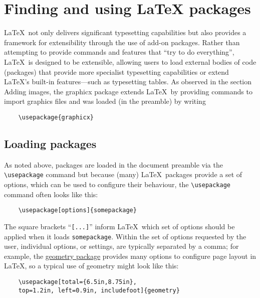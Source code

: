 \section{Finding and using LaTeX packages}
\label{sec:16}

\LaTeX\ not only delivers significant typesetting capabilities but also provides a framework for extensibility through the use of add-on packages. Rather than attempting to provide commands and features that “try to do everything”, \LaTeX\ is designed to be extensible, allowing users to load external bodies of code (packages) that provide more specialist typesetting capabilities or extend \LaTeX’s built-in features—such as typesetting tables. As observed in the section Adding images, the graphicx package extends \LaTeX\ by providing commands to import graphics files and was loaded (in the preamble) by writing

\begin{tcolorbox}
\begin{verbatim}
    \usepackage{graphicx}
\end{verbatim}
\end{tcolorbox}

\subsection{Loading packages}

As noted above, packages are loaded in the document preamble via the \verb|\usepackage| command but because (many) \LaTeX\ packages provide a set of options, which can be used to configure their behaviour, the \verb|\usepackage| command often looks like this:

\begin{tcolorbox}
\begin{verbatim}
    \usepackage[options]{somepackage}
\end{verbatim}
\end{tcolorbox}

The square brackets “\verb|[...]|” inform \LaTeX\ which set of options should be applied when it loads \verb|somepackage|. Within the set of options requested by the user, individual options, or settings, are typically separated by a comma; for example, the \href{https://ctan.org/pkg/geometry}{geometry package} provides many options to configure page layout in \LaTeX, so a typical use of geometry might look like this:

\begin{tcolorbox}
\begin{verbatim}
    \usepackage[total={6.5in,8.75in},
    top=1.2in, left=0.9in, includefoot]{geometry}
\end{verbatim}
\end{tcolorbox}

